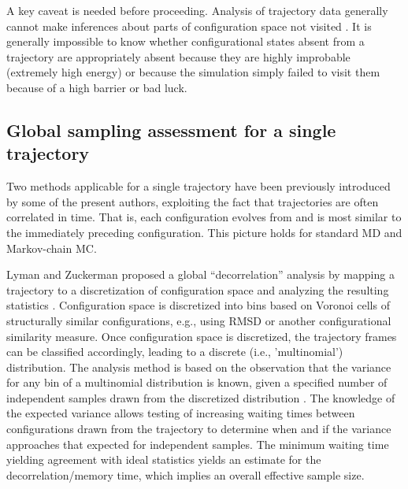 A key caveat is needed before proceeding.
Analysis of trajectory data generally cannot make inferences about parts of configuration space not visited \cite{Grossfield2009}.
It is generally impossible to know whether configurational states absent from a trajectory are appropriately absent because they are highly improbable (extremely high energy) or because the simulation simply failed to visit them because of a high barrier or bad luck.

\subsection{Global sampling assessment for a single trajectory}
Two methods applicable for a single trajectory have been previously introduced by some of the present authors, exploiting the fact that trajectories are often correlated in time.
That is, each configuration evolves from and is most similar to the immediately preceding configuration.
This picture holds for standard MD and Markov-chain MC.

Lyman and Zuckerman proposed a global ``decorrelation'' analysis by mapping a trajectory to a discretization of configuration space and analyzing the resulting statistics \cite{Lyman2007a}.  
Configuration space is discretized into bins based on Voronoi cells of structurally similar configurations,  e.g., using RMSD or another configurational similarity measure.
Once configuration space is discretized, the trajectory frames can be classified accordingly, leading to a discrete (i.e., 'multinomial') distribution.
The analysis method is based on the observation that the variance for any bin of a multinomial distribution is known, given a specified number of independent samples drawn from the discretized distribution \cite{Lyman2007a}.
The knowledge of the expected variance allows testing of increasing waiting times between configurations drawn from the trajectory to determine when and if the variance approaches that expected for independent samples.
The minimum waiting time yielding agreement with ideal statistics yields an estimate for the decorrelation/memory time, which implies an overall effective sample size. %



